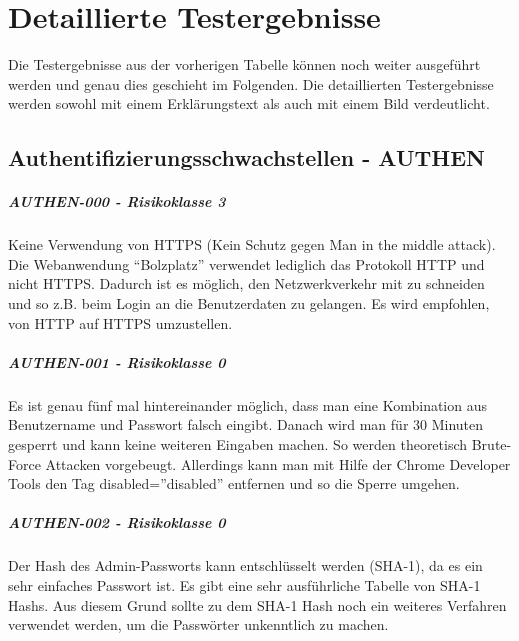 \chapter{Detaillierte Testergebnisse}
Die Testergebnisse aus der vorherigen Tabelle können noch weiter ausgeführt werden und genau dies geschieht im Folgenden. Die detaillierten Testergebnisse werden sowohl mit einem Erklärungstext als auch mit einem Bild verdeutlicht.


\section{Authentifizierungsschwachstellen - AUTHEN }

\paragraph{AUTHEN-000 - Risikoklasse 3}
Keine Verwendung von HTTPS (Kein Schutz gegen Man in the middle attack). Die Webanwendung “Bolzplatz” verwendet lediglich das Protokoll HTTP und nicht HTTPS. Dadurch ist es möglich, den Netzwerkverkehr mit zu schneiden und so z.B. beim Login an die Benutzerdaten zu gelangen. Es wird empfohlen, von HTTP auf HTTPS umzustellen.

\clearpage
\paragraph{AUTHEN-001 - Risikoklasse 0}
Es ist genau fünf mal hintereinander möglich, dass man eine Kombination aus Benutzername und Passwort falsch eingibt. Danach wird man für 30 Minuten gesperrt und kann keine weiteren Eingaben machen. So werden theoretisch Brute-Force Attacken vorgebeugt.
\newline
Allerdings kann man mit Hilfe der Chrome Developer Tools den Tag disabled=”disabled” entfernen und so die Sperre umgehen.

\clearpage
\paragraph{AUTHEN-002 - Risikoklasse 0}
Der Hash des Admin-Passworts kann entschlüsselt werden (SHA-1), da es ein sehr einfaches Passwort ist. Es gibt eine sehr ausführliche Tabelle von SHA-1 Hashs. Aus diesem Grund sollte zu dem SHA-1 Hash noch ein weiteres Verfahren verwendet werden, um die Passwörter unkenntlich zu machen. 

